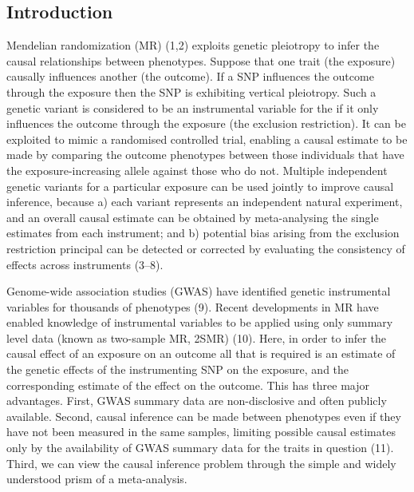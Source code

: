 \documentclass[]{article}
\begin{document}
\subsection{Introduction}\label{introduction}

Mendelian randomization (MR) (1,2) exploits genetic pleiotropy to infer
the causal relationships between phenotypes. Suppose that one trait (the
exposure) causally influences another (the outcome). If a SNP influences
the outcome through the exposure then the SNP is exhibiting vertical
pleiotropy. Such a genetic variant is considered to be an instrumental
variable for the if it only influences the outcome through the exposure
(the exclusion restriction). It can be exploited to mimic a randomised
controlled trial, enabling a causal estimate to be made by comparing the
outcome phenotypes between those individuals that have the
exposure-increasing allele against those who do not. Multiple
independent genetic variants for a particular exposure can be used
jointly to improve causal inference, because a) each variant represents
an independent natural experiment, and an overall causal estimate can be
obtained by meta-analysing the single estimates from each instrument;
and b) potential bias arising from the exclusion restriction principal
can be detected or corrected by evaluating the consistency of effects
across instruments (3--8).

Genome-wide association studies (GWAS) have identified genetic
instrumental variables for thousands of phenotypes (9). Recent
developments in MR have enabled knowledge of instrumental variables to
be applied using only summary level data (known as two-sample MR, 2SMR)
(10). Here, in order to infer the causal effect of an exposure on an
outcome all that is required is an estimate of the genetic effects of
the instrumenting SNP on the exposure, and the corresponding estimate of
the effect on the outcome. This has three major advantages. First, GWAS
summary data are non-disclosive and often publicly available. Second,
causal inference can be made between phenotypes even if they have not
been measured in the same samples, limiting possible causal estimates
only by the availability of GWAS summary data for the traits in question
(11). Third, we can view the causal inference problem through the simple
and widely understood prism of a meta-analysis.
\end{document}
